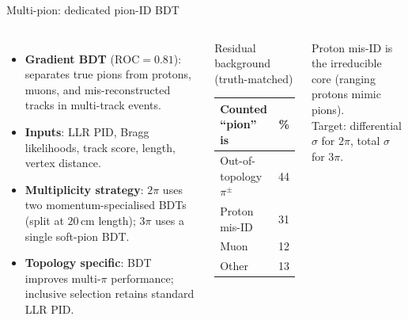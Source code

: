 \documentclass[aspectratio=169,10pt]{beamer}
\begin{document}
\begin{frame}{Multi-pion: dedicated pion-ID BDT}
  \begin{columns}[T]
  \footnotesize
  \begin{itemize}\setlength\itemsep{2pt}
    \item \textbf{Gradient BDT} ($\text{ROC}=0.81$): separates true pions from protons, muons, and mis-reconstructed tracks in multi-track events.
    \item \textbf{Inputs}: LLR PID, Bragg likelihoods, track score, length, vertex distance.
    \item \textbf{Multiplicity strategy}: $2\pi$ uses two momentum-specialised BDTs (split at $20$\,cm length); $3\pi$ uses a single soft-pion BDT.
    \item \textbf{Topology specific}: BDT improves multi-$\pi$ performance; inclusive selection retains standard LLR PID.
  \end{itemize}
  \begin{block}{Residual background (truth-matched)}\footnotesize
  \begin{tabular}{lr}
  \toprule Counted ``pion'' is & \%\\\midrule
  Out-of-topology $\pi^\pm$ & 44\\
  Proton mis-ID & 31\\
  Muon & 12\\
  Other & 13\\
  \bottomrule
  \end{tabular}
  \end{block}
  {\scriptsize Proton mis-ID is the irreducible core (ranging protons mimic pions).\\[1mm]
  Target: differential $\sigma$ for $2\pi$, total $\sigma$ for $3\pi$.}
\end{columns}
\end{frame}
\end{document}
